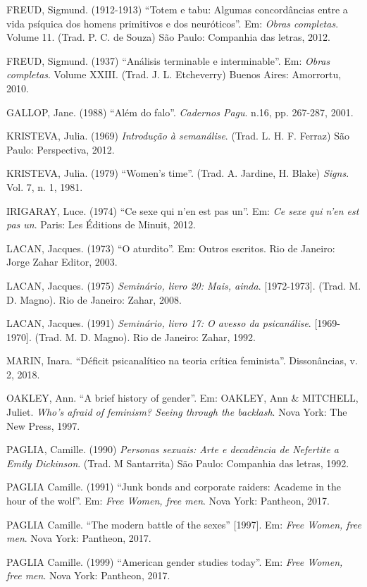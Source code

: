 FREUD, Sigmund. (1912-1913) ``Totem e tabu: Algumas concordâncias entre
a vida psíquica dos homens primitivos e dos neuróticos''. Em:
\emph{Obras completas}. Volume 11. (Trad. P. C. de Souza) São Paulo:
Companhia das letras, 2012.

FREUD, Sigmund. (1937) ``Análisis terminable e interminable''. Em:
\emph{Obras completas}. Volume XXIII. (Trad. J. L. Etcheverry) Buenos
Aires: Amorrortu, 2010.

GALLOP, Jane. (1988) ``Além do falo''. \emph{Cadernos Pagu}. n.16, pp.
267-287, 2001.

KRISTEVA, Julia. (1969) \emph{Introdução à semanálise}. (Trad. L. H. F.
Ferraz) São Paulo: Perspectiva, 2012.

KRISTEVA, Julia. (1979) ``Women's time''. (Trad. A. Jardine, H. Blake)
\emph{Signs}. Vol. 7, n. 1, 1981.

IRIGARAY, Luce. (1974) ``Ce sexe qui n'en est pas un''. Em: \emph{Ce
sexe qui n'en est pas un}. Paris: Les Éditions de Minuit, 2012.

LACAN, Jacques. (1973) ``O aturdito''. Em: Outros escritos. Rio de
Janeiro: Jorge Zahar Editor, 2003.

LACAN, Jacques. (1975) \emph{Seminário, livro 20: Mais, ainda}.
{[}1972-1973{]}. (Trad. M. D. Magno). Rio de Janeiro: Zahar, 2008.

LACAN, Jacques. (1991) \emph{Seminário, livro 17: O avesso da
psicanálise}. {[}1969-1970{]}. (Trad. M. D. Magno). Rio de Janeiro:
Zahar, 1992.

MARIN, Inara. ``Déficit psicanalítico na teoria crítica feminista''.
Dissonâncias, v. 2, 2018.

OAKLEY, Ann. ``A brief history of gender''. Em: OAKLEY, Ann \& MITCHELL,
Juliet. \emph{Who's afraid of feminism? Seeing through the backlash}.
Nova York: The New Press, 1997.

PAGLIA, Camille. (1990) \emph{Personas sexuais: Arte e decadência de
Nefertite a Emily Dickinson}. (Trad. M Santarrita) São Paulo: Companhia
das letras, 1992.

PAGLIA Camille. (1991) ``Junk bonds and corporate raiders: Academe in
the hour of the wolf''. Em: \emph{Free Women, free men}. Nova York:
Pantheon, 2017.

PAGLIA Camille. ``The modern battle of the sexes'' {[}1997{]}. Em:
\emph{Free Women, free men}. Nova York: Pantheon, 2017.

PAGLIA Camille. (1999) ``American gender studies today''. Em: \emph{Free
Women, free men}. Nova York: Pantheon, 2017.

